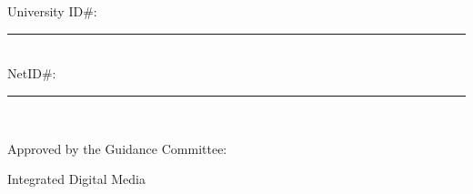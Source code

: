 \noindent
\makebox[\textwidth]{\hfill\makebox[2.5in]{\hrulefill}}\\
\vspace{0.05in}

\noindent
\makebox[\textwidth]{\hfill\makebox[2.5in]{\hrulefill}}\\
\vspace{0.05in}

\vspace{-0.01in}
\noindent
\begin{doublespace}
University ID\#:\hspace{3pt} \noindent\rule[-3pt]{2in}{0.4pt}\\
\vspace{0.25in}
NetID\#: \hspace{35pt} \noindent\rule[-3pt]{2in}{0.4pt}\\
\end{doublespace}

\vspace{-0.25in}
\noindent
Approved by the Guidance Committee:
\singlespacing

\noindent
Integrated Digital Media
\vspace{0.1in}
